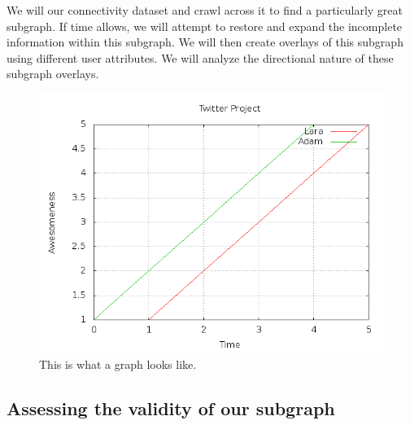 We will our connectivity dataset and crawl across it to find a particularly great subgraph.  If time allows, we will attempt to restore and expand the incomplete information within this subgraph.  We will then create overlays of this subgraph using different user attributes.  We will analyze the directional nature of these subgraph overlays.

\begin{figure}
 \centering
 \includegraphics[bb=0 0 640 480,scale=.25]{./images/evidence.png}
 \caption{This is what a graph looks like.}
 \label{Figure 1:}
\end{figure}

\subsection{Assessing the validity of our subgraph}